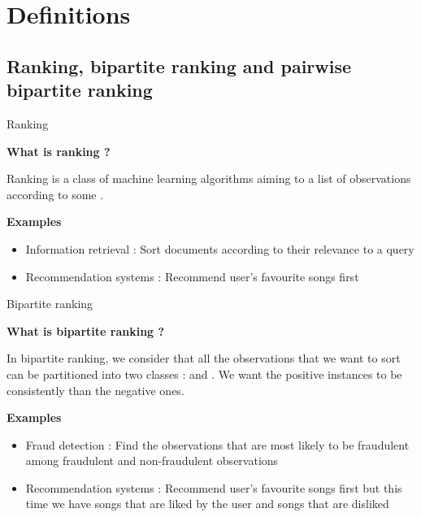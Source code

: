 \section{Definitions}
\subsection{Ranking, bipartite ranking and pairwise bipartite ranking}

\begin{frame}{Ranking}

    {\large\textbf{What is ranking ?}}
    
    Ranking is a class of machine learning algorithms aiming to  a list of observations according to some . 
    
    \vspace{0.3cm}
    
    {\large\textbf{Examples}}
    
    \begin{itemize}
        \item Information retrieval : Sort documents according to their relevance to a query
        \item Recommendation systems : Recommend user's favourite songs first
    \end{itemize}
\end{frame}

\begin{frame}{Bipartite ranking}

    {\large\textbf{What is bipartite ranking ?}}
    
    In bipartite ranking, we consider that all the observations that we want to sort can be partitioned into two classes :  and . We want the positive instances to be consistently  than the negative ones.
    
    \vspace{0.3cm}

    {\large\textbf{Examples}}
    
    \begin{itemize}
        \item Fraud detection : Find the observations that are most likely to be fraudulent among fraudulent and non-fraudulent observations
        \item Recommendation systems : Recommend user's favourite songs first but this time we have songs that are liked by the user and songs that are disliked
    \end{itemize}
\end{frame}

